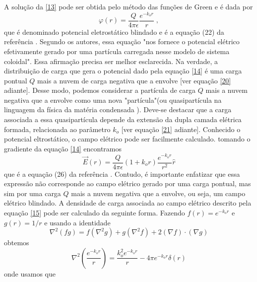 \documentclass[brazilian,10.7pt,a4paper]{article}
\begin{document}
\begin{multicols}{2}
\par A solução da \eqref{13} pode ser obtida pelo método das funções de Green e é dada por 
\\
\begin{equation}\label{14}
\varphi(r)=\frac{Q}{4\pi\epsilon}\frac{e^{-k_{o}r}}{r}\;,
\end{equation}
que é denominado potencial eletrostático blindado e é a equação (22) da referência \cite{ramos}. Segundo os autores, essa equação "nos fornece o potencial elétrico efetivamente gerado por uma partícula carregada nesse modelo de sistema coloidal". Essa afirmação precisa ser melhor esclarecida. Na verdade, a distribuição de carga que gera o potencial dado pela equação \eqref{14} é uma carga pontual $Q$ mais a nuvem de carga negativa que a envolve [ver equação \eqref{20} adiante]. Desse modo, podemos considerar a partícula de carga $Q$ mais a nuvem negativa que a envolve como uma nova "partícula"(ou quasipartícula na linguagem da física da matéria condensada \cite{ribeiro}). Deve-se destacar que a carga associada a essa quasipartícula depende da extensão da dupla camada elétrica formada, relacionada ao parâmetro $k_{o}$ [ver equação \eqref{21} adiante]. Conhecido o potencial eltrostático, o campo elétrico pode ser facilmente calculado. tomando o gradiente da equação \eqref{14} encontramos
\\
\begin{equation}\label{15}
\vec{E}(r)=\frac{Q}{4\pi\epsilon}(1+k_{o}r)\frac{e^{-k_{o}r}}{r^{2}}\hat{r}
\end{equation}
que é a equação (26) da referência \cite{ramos}. Contudo, é importante enfatizar que essa expressão não corresponde ao campo elétrico gerado por uma carga pontual, mas sim por uma carga $Q$ mais a nuvem negativa que a envolve, ou seja, um campo elétrico blindado. A densidade de carga associada ao campo elétrico descrito pela equação \eqref{15} pode ser calculado da seguinte forma. Fazendo $f(r)=e^{-k_{o}r}$ e $g(r) = 1/r$ e usando a identidade
\\
\begin{equation}\label{16}
\nabla^{2}(fg)=f(\nabla^{2}g)+g(\nabla^{2}f)+2(\nabla f)\cdot(\nabla g)
\end{equation}
obtemos
\\
\begin{equation}\label{17}
\nabla^{2}\left(\frac{e^{-k_{o}r}}{r}\right)=\frac{k^{2}_{o}e^{-k_{o}r}}{r}-4\pi e^{-k_{o}r}\delta(r)
\end{equation}
onde usamos que

\end{multicols} %
\twocolumn		%
\end{document}
